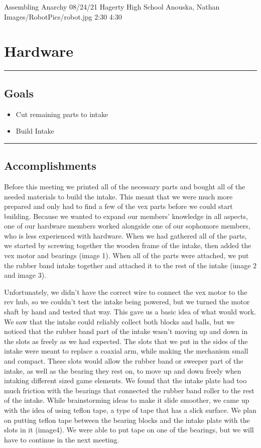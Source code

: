 \insertmeeting 
	{Assembling Anarchy} 
	{08/24/21}
	{Hagerty High School}
	{Anouska, Nathan}
	{Images/RobotPics/robot.jpg}
	{2:30}
 	{4:30}
	
\section*{Hardware}
\noindent\hfil\rule{\textwidth}{.4pt}\hfil
\subsection*{Goals}
\begin{itemize}
    \item Cut remaining parts to intake
    \item Build Intake 

\end{itemize} 

\noindent\hfil\rule{\textwidth}{.4pt}\hfil

\subsection*{Accomplishments}
Before this meeting we printed all of the necessary parts and bought all of the needed materials to build the intake. This meant that we were much more prepared and only had to find a few of the vex parts before we could start building. Because we wanted to expand our members’ knowledge in all aspects, one of our hardware members worked alongside one of our sophomore members, who is less experienced with hardware. When we had gathered all of the parts, we started by screwing together the wooden frame of the intake, then added the vex motor and bearings (image 1). When all of the parts were attached, we put the rubber band intake together and attached it to the rest of the intake (image 2 and image 3). 

Unfortunately, we didn't have the correct wire to connect the vex motor to the rev hub, so we couldn’t test the intake being powered, but we turned the motor shaft by hand and tested that way. This gave us a basic idea of what would work. We saw that the intake could reliably collect both blocks and balls, but we noticed that the rubber band part of the intake wasn’t moving up and down in the slots as freely as we had expected. The slots that we put in the sides of the intake were meant to replace a coaxial arm, while making the mechanism small and compact. These slots would allow the rubber band or sweeper part of the intake, as well as the bearing they rest on, to move up and down freely when intaking different sized game elements. We found that the intake plate  had too much friction with the bearings that connected the rubber band roller to the rest of the intake. While brainstorming ideas to make it slide smoother, we came up with the idea of using teflon tape, a type of tape that has a slick surface. We plan on putting teflon tape between the bearing blocks and the intake plate with the slots in it (image4). We were able to put tape on one of the bearings, but we will have to continue in the next meeting. 


